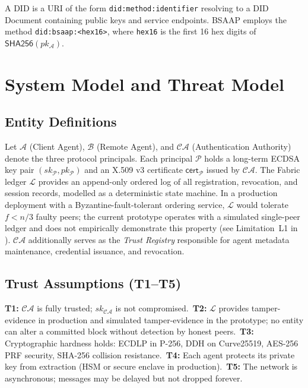 \documentclass[review,5p,twocolumn,times]{elsarticle}
\begin{document}
A DID \cite{w3c2022did} is a URI of the form \texttt{did:method:identifier}
resolving to a DID Document containing public keys and service endpoints.
BSAAP employs the method \texttt{did:bsaap:<hex16>}, where \texttt{hex16}
is the first 16 hex digits of $\mathsf{SHA256}(pk_\mathcal{A})$.

\section{System Model and Threat Model}\label{sec:model}

\subsection{Entity Definitions}

Let $\mathcal{A}$ (Client Agent), $\mathcal{B}$ (Remote Agent), and
$\mathcal{CA}$ (Authentication Authority) denote the three protocol principals.
Each principal $\mathcal{P}$ holds a long-term ECDSA key pair
$(sk_\mathcal{P}, pk_\mathcal{P})$ and an X.509 v3 certificate
$\mathsf{cert}_\mathcal{P}$ issued by $\mathcal{CA}$.
The Fabric ledger $\mathcal{L}$ provides an append-only ordered log of all
registration, revocation, and session records, modelled as a deterministic
state machine. In a production deployment with a Byzantine-fault-tolerant
ordering service, $\mathcal{L}$ would tolerate $f < n/3$ faulty peers; the
current prototype operates with a simulated single-peer ledger and does not
empirically demonstrate this property (see Limitation~L1 in ).
$\mathcal{CA}$ additionally serves as the \emph{Trust Registry} responsible
for agent metadata maintenance, credential issuance, and revocation.

\subsection{Trust Assumptions (T1--T5)}

\textbf{T1:} $\mathcal{CA}$ is fully trusted; $sk_{\mathcal{CA}}$ is not
compromised.~\textbf{T2:} $\mathcal{L}$ provides tamper-evidence in production
and simulated tamper-evidence in the prototype; no entity can alter a committed
block without detection by honest peers.~\textbf{T3:}
Cryptographic hardness holds: ECDLP in P-256, DDH on Curve25519, AES-256 PRF
security, SHA-256 collision resistance.~\textbf{T4:} Each agent protects its
private key from extraction (HSM or secure enclave in production).~\textbf{T5:}
The network is asynchronous; messages may be delayed but not dropped forever.
\end{document}

